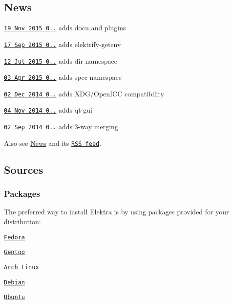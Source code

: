 \subsection*{News}


\begin{DoxyItemize}
\item \href{http://doc.libelektra.org/news/519cbfac-6db5-4594-8a38-dec4c84b134f.html}{\tt 19 Nov 2015 0..} adds docu and plugins
\item \href{http://doc.libelektra.org/news/3c00a5f1-c017-4555-92b5-a2cf6e0803e3.html}{\tt 17 Sep 2015 0..} adds elektrify-\/getenv
\item \href{http://doc.libelektra.org/news/98770541-32a1-486a-98a1-d02f26afc81a.html}{\tt 12 Jul 2015 0..} adds dir namespace
\item \href{http://doc.libelektra.org/news/7d4647d4-4131-411e-9c2a-2aca39446e18.html}{\tt 03 Apr 2015 0..} adds spec namespace
\item \href{http://doc.libelektra.org/news/6ce57ecf-420a-4a31-821e-1c5fe5532eb4.html}{\tt 02 Dec 2014 0..} adds X\+D\+G/\+Open\+I\+C\+C compatibility
\item \href{http://doc.libelektra.org/news/38640673-3e07-4cff-9647-f6bdd89b1b08.html}{\tt 04 Nov 2014 0..} adds qt-\/gui
\item \href{http://doc.libelektra.org/news/eca69e19-5ddb-438c-ac06-57c20b1a9160.html}{\tt 02 Sep 2014 0..} adds 3-\/way merging
\end{DoxyItemize}

Also see \hyperlink{doc_NEWS_md}{News} and its \href{http://www.libelektra.org/news/feed.rss}{\tt R\+S\+S feed}.

\subsection*{Sources}

\subsubsection*{Packages}

The preferred way to install Elektra is by using packages provided for your distribution\+:
\begin{DoxyItemize}
\item \href{https://admin.fedoraproject.org/pkgdb/package/elektra/}{\tt Fedora}
\item \href{http://packages.gentoo.org/package/app-admin/elektra}{\tt Gentoo}
\item \href{https://aur.archlinux.org/packages/elektra/}{\tt Arch Linux}
\item \href{https://packages.debian.org/de/jessie/libelektra4}{\tt Debian}
\item \href{https://launchpad.net/ubuntu/+source/elektra}{\tt Ubuntu}
\end{DoxyItemize}

